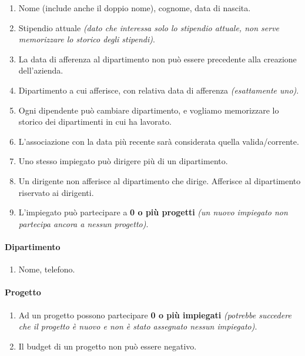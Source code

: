 \documentclass{article}
\begin{document}
\begin{enumerate}
    \item Nome (include anche il doppio nome), cognome, data di nascita. 
    \item Stipendio attuale \textit{(dato che interessa solo lo stipendio attuale, non serve memorizzare lo storico degli stipendi)}.
    \item La data di afferenza al dipartimento non può essere precedente alla creazione dell'azienda.
    \item Dipartimento a cui afferisce, con relativa data di afferenza \textit{(esattamente uno)}.
    \item Ogni dipendente può cambiare dipartimento, e vogliamo memorizzare lo storico dei dipartimenti in cui ha lavorato.
    \item L'associazione con la data più recente sarà considerata 
    quella valida/corrente.
    \item Uno stesso impiegato può dirigere più di un dipartimento.
    \item Un dirigente non afferisce al dipartimento che dirige. Afferisce al dipartimento riservato ai dirigenti.
    \item L'impiegato può partecipare a \textbf{0 o più progetti} \textit{(un nuovo impiegato non partecipa ancora a nessun progetto)}.
\end{enumerate}

\paragraph{Dipartimento}

\begin{enumerate}
    \item Nome, telefono.
\end{enumerate}

\paragraph{Progetto}

\begin{enumerate}
    \item Ad un progetto possono partecipare \textbf{0 o più impiegati} \textit{(potrebbe succedere che il progetto è nuovo e non è stato assegnato nessun impiegato)}.
    \item Il budget di un progetto non può essere negativo. 
\end{enumerate}
\end{document}
